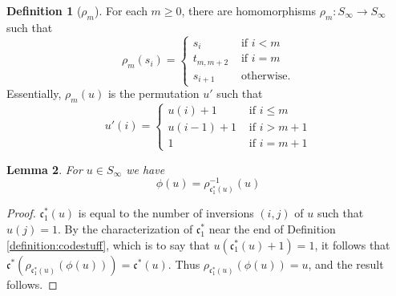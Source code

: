 \documentclass[reqno]{amsart}
\newtheorem{lemma}{Lemma}[subsection]
\theoremstyle{definition}
\newtheorem{definition}[lemma]{Definition}
\theoremstyle{remark}
\numberwithin{equation}{subsection}
\newcommand{\code}{\mathfrak{c}}
\begin{document}

\begin{definition}[$\rho_m$] \label{definition:rhom}
For each $m\geq 0$, there are homomorphisms $\rho_m:S_\infty\to S_\infty$ such that
$$\rho_m(s_i)=\begin{cases}
	s_i&\mbox{ if }i<m\\
	t_{m,m+2}&\mbox{ if }i=m\\
	s_{i+1}&\mbox{ otherwise.}
\end{cases}$$
Essentially, $\rho_m(u)$ is the permutation $u'$ such that
$$u'(i)=\begin{cases}
	u(i)+1&\mbox{ if }i\leq m\\
	u(i-1)+1&\mbox{ if }i>m+1\\
	1&\mbox{ if }i=m+1
\end{cases}$$
\end{definition}

\begin{lemma} \label{lemma:phitrans}
	For $u\in S_\infty$ we have
	$$\phi(u) = \rho_{\code^*_1(u)}^{-1}(u)$$
\end{lemma}
\begin{proof}
$\code^*_1(u)$ is equal to the number of inversions $(i,j)$ of $u$ such that $u(j)=1$. By the characterization of $\code^*_1$ near the end of Definition \ref{definition:codestuff}, which is to say that $u(\code^*_1(u)+1)=1$, it follows that $\code^*(\rho_{\code^*_1(u)}(\phi(u))) = \code^*(u)$. Thus $\rho_{\code^*_1(u)}(\phi(u))=u$, and the result follows.
\end{proof}
\end{document}
